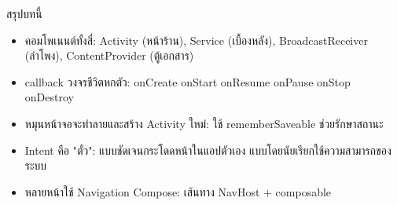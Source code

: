 \begin{tcbsummary}{สรุปบทนี้}
\begin{itemize}
  \item คอมโพเนนต์ทั้งสี่: Activity (หน้าร้าน), Service (เบื้องหลัง), BroadcastReceiver (ลำโพง), ContentProvider (ตู้เอกสาร)
  \item callback วงจรชีวิตหกตัว: onCreate onStart onResume onPause onStop onDestroy
  \item หมุนหน้าจอจะทำลายและสร้าง Activity ใหม่: ใช้ rememberSaveable ช่วยรักษาสถานะ
  \item Intent คือ "ตั๋ว": แบบชัดเจนกระโดดหน้าในแอปตัวเอง แบบโดยนัยเรียกใช้ความสามารถของระบบ
  \item หลายหน้าใช้ Navigation Compose: เส้นทาง NavHost + composable
\end{itemize}

\end{tcbsummary}
